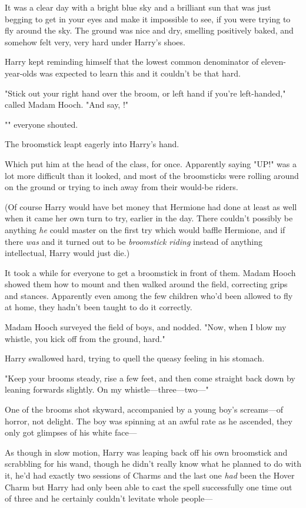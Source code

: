 It was a clear day with a bright blue sky and a brilliant sun that was just
begging to get in your eyes and make it impossible to see, if you were trying
to fly around the sky. The ground was nice and dry, smelling positively baked,
and somehow felt very, very hard under Harry's shoes.

Harry kept reminding himself that the lowest common denominator of
eleven-year-olds was expected to learn this and it couldn't be that hard.

"Stick out your right hand over the broom, or left hand if you're left-handed,"
called Madam Hooch. "And say, !"

"" everyone shouted.

The broomstick leapt eagerly into Harry's hand.

Which put him at the head of the class, for once. Apparently saying "UP!" was a
lot more difficult than it looked, and most of the broomsticks were rolling
around on the ground or trying to inch away from their would-be riders.

(Of course Harry would have bet money that Hermione had done at least as well
when it came her own turn to try, earlier in the day. There couldn't possibly
be anything \emph{he} could master on the first try which would baffle
Hermione, and if there \emph{was} and it turned out to be \emph{broomstick
riding} instead of anything intellectual, Harry would just die.)

It took a while for everyone to get a broomstick in front of them. Madam Hooch
showed them how to mount and then walked around the field, correcting grips and
stances. Apparently even among the few children who'd been allowed to fly at
home, they hadn't been taught to do it correctly.

Madam Hooch surveyed the field of boys, and nodded. "Now, when I blow my
whistle, you kick off from the ground, hard."

Harry swallowed hard, trying to quell the queasy feeling in his stomach.

"Keep your brooms steady, rise a few feet, and then come straight back down by
leaning forwards slightly. On my whistle---three---two\mbox{---}"

One of the brooms shot skyward, accompanied by a young boy's screams---of
horror, not delight. The boy was spinning at an awful rate as he ascended, they
only got glimpses of his white face\mbox{---}

As though in slow motion, Harry was leaping back off his own broomstick and
scrabbling for his wand, though he didn't really know what he planned to do
with it, he'd had exactly two sessions of Charms and the last one \emph{had}
been the Hover Charm but Harry had only been able to cast the spell
successfully one time out of three and he certainly couldn't levitate whole
people\mbox{---}

